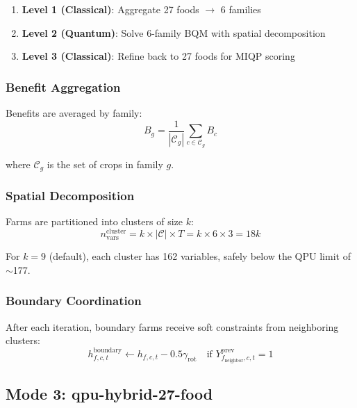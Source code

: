 \documentclass[11pt,a4paper]{article}
\begin{document}
\begin{enumerate}
    \item \textbf{Level 1 (Classical)}: Aggregate 27 foods $\to$ 6 families
    \item \textbf{Level 2 (Quantum)}: Solve 6-family BQM with spatial decomposition
    \item \textbf{Level 3 (Classical)}: Refine back to 27 foods for MIQP scoring
\end{enumerate}

\subsubsection{Benefit Aggregation}

Benefits are averaged by family:
\begin{equation}
B_g = \frac{1}{|\mathcal{C}_g|} \sum_{c \in \mathcal{C}_g} B_c
\end{equation}

where $\mathcal{C}_g$ is the set of crops in family $g$.

\subsubsection{Spatial Decomposition}

Farms are partitioned into clusters of size $k$:
\begin{equation}
n_{\text{vars}}^{\text{cluster}} = k \times |\mathcal{C}| \times T = k \times 6 \times 3 = 18k
\end{equation}

For $k=9$ (default), each cluster has 162 variables, safely below the QPU limit of $\sim$177.

\subsubsection{Boundary Coordination}

After each iteration, boundary farms receive soft constraints from neighboring clusters:
\begin{equation}
h^{\text{boundary}}_{f,c,t} \leftarrow h_{f,c,t} - 0.5 \gamma_{\text{rot}} \quad \text{if } Y^{\text{prev}}_{f_{\text{neighbor}},c,t} = 1
\end{equation}

\subsection{Mode 3: qpu-hybrid-27-food}
\end{document}
